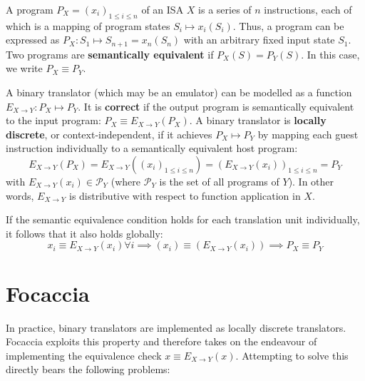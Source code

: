 A program $P_X = (x_i)_{1 \leq i \leq n}$ of an \ac{ISA} $X$ is a series of $n$ instructions, each of which is a mapping
of program states $S_i \mapsto x_i(S_i)$. Thus, a program can be expressed as
    $P_X : S_1 \mapsto S_{n+1} = x_n(S_n)$
with an arbitrary fixed input state $S_1$. Two programs are \textbf{semantically equivalent} if $P_X(S) = P_Y(S)$. In
this case, we write $P_X \equiv P_Y$.

A binary translator (which may be an emulator) can be modelled as a function $E_{X \rightarrow Y}: P_X \mapsto P_Y$. It
is \textbf{correct} if the output program is semantically equivalent to the input program:
    $P_X \equiv E_{X \rightarrow Y}(P_X)$.
A binary translator is \textbf{locally discrete}, or context-independent, if it achieves $P_X \mapsto P_Y$ by mapping
each guest instruction individually to a semantically equivalent host program:
\begin{equation}\label{sem_eq}
    E_{X\rightarrow Y}(P_X) = E_{X \rightarrow Y}((x_i)_{1 \leq i \leq n}) = (E_{X \rightarrow Y}(x_i))_{1 \leq i \leq n} = P_Y
\end{equation}
with $E_{X\rightarrow Y}(x_i) \in \mathcal{P}_Y$ (where $\mathcal{P}_Y$ is the set of all programs of $Y$). In other
words, $E_{X\rightarrow Y}$ is distributive with respect to function application in $X$.

If the semantic equivalence condition holds for each translation unit individually, it follows that it also holds globally:
\begin{equation}
    x_i \equiv E_{X\rightarrow Y}(x_i) \forall i \implies (x_i) \equiv (E_{X\rightarrow Y}(x_i)) \implies P_X \equiv P_Y
\end{equation}

\section{Focaccia}

In practice, binary translators are implemented as locally discrete translators. Focaccia exploits this property and
therefore takes on the endeavour of implementing the equivalence check $x \equiv E_{X \rightarrow Y}(x)$. Attempting to
solve this directly bears the following problems:

